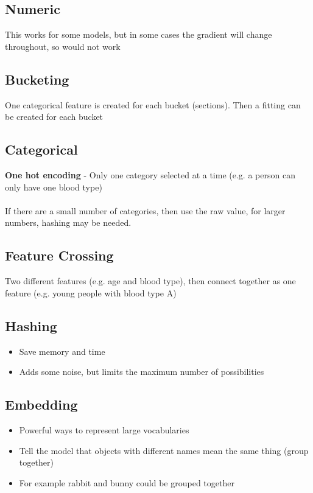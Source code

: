 \documentclass{article}[18pt]
\begin{document}
\subsection{Numeric}
This works for some models, but in some cases the gradient will change throughout, so would not work
\subsection{Bucketing}
One categorical feature is created for each bucket (sections). Then a fitting can be created for each bucket
\subsection{Categorical}
\textbf{One hot encoding} - Only one category selected at a time (e.g. a person can only have one blood type)\\
\\
If there are a small number of categories, then use the raw value, for larger numbers, hashing may be needed.
\subsection{Feature Crossing}
Two different features (e.g. age and blood type), then connect together as one feature (e.g. young people with blood type A)
\subsection{Hashing}
\begin{itemize}
	\item Save memory and time
	\item Adds some noise, but limits the maximum number of possibilities
\end{itemize}
\subsection{Embedding}
\begin{itemize}
	\item Powerful ways to represent large vocabularies
	\item Tell the model that objects with different names mean the same thing (group together)
	\item For example rabbit and bunny could be grouped together
\end{itemize}
\end{document}
